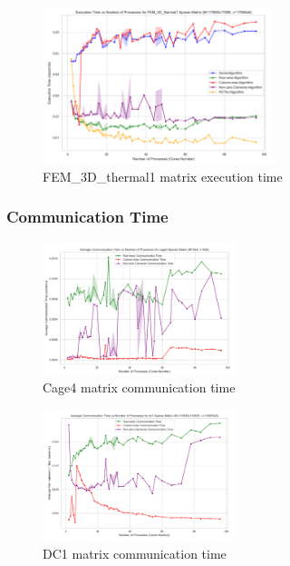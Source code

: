 \documentclass[12pt,oneside]{book} %
\begin{document}
\begin{figure}[H]
    \centering
    \includegraphics[width=0.6\textwidth]{../results/matrix_dim/FEM_3D_thermal1_k6_execution_time.png}
    \caption{FEM\_3D\_thermal1 matrix execution time}\label{fig:fem-3d-thermal1-k6-execution-time}
\end{figure}

\subsubsection{Communication Time}

\begin{figure}[H]
    \centering
    \includegraphics[width=0.5\textwidth]{../results/matrix_dim/cage4_k6_communication_time.png}
    \caption{Cage4 matrix communication time}\label{fig:cage4-k6-communication-time}
\end{figure}

\begin{figure}[H]
    \centering
    \includegraphics[width=0.5\textwidth]{../results/matrix_dim/dc1_k6_communication_time.png}
    \caption{DC1 matrix communication time}\label{fig:dc1-k6-communication-time}
\end{figure}
\end{document}
